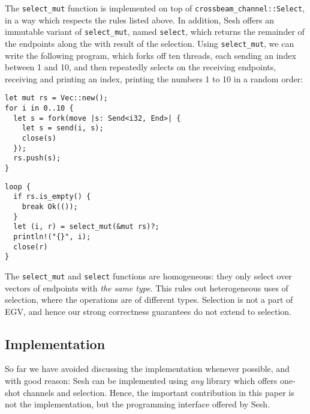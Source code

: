\documentclass[copyright,creativecommons]{eptcs}
\begin{document}
The \lstinline{select_mut} function is implemented on top of \lstinline{crossbeam_channel::Select}, in a way which respects the rules listed above. In addition, Sesh offers an immutable variant of \lstinline{select_mut}, named \lstinline{select}, which returns the remainder of the endpoints along the with result of the selection. Using \lstinline{select_mut}, we can write the following program, which forks off ten threads, each sending an index between 1 and 10, and then repeatedly selects on the receiving endpoints, receiving and printing an index, printing the numbers 1 to 10 in a random order:

\vspace{-0.5\baselineskip}
\begin{minipage}[t]{0.5\linewidth}
\begin{lstlisting}
let mut rs = Vec::new();
for i in 0..10 {
  let s = fork(move |s: Send<i32, End>| {
    let s = send(i, s);
    close(s)
  });
  rs.push(s);
}
\end{lstlisting}
\end{minipage}%
\begin{minipage}[t]{0.5\linewidth}
\begin{lstlisting}
loop {
  if rs.is_empty() {
    break Ok(());
  }
  let (i, r) = select_mut(&mut rs)?;
  println!("{}", i);
  close(r)
}
\end{lstlisting}
\end{minipage}
\vspace{-0.25\baselineskip}

The \lstinline{select_mut} and \lstinline{select} functions are homogeneous: they only select over vectors of endpoints with \emph{the same type}. This rules out heterogeneous uses of selection, where the operations are of different types. Selection is not a part of EGV, and hence our strong correctness guarantees do not extend to selection.

\subsection{Implementation}\label{sec:implementation}
So far we have avoided discussing the implementation whenever possible, and with good reason: Sesh can be implemented using \emph{any} library which offers one-shot channels and selection. Hence, the important contribution in this paper is not the implementation, but the programming interface offered by Sesh.
\end{document}
